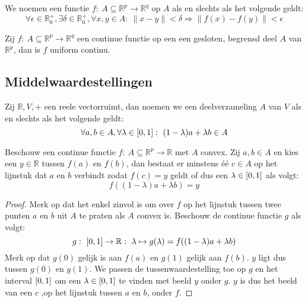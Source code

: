 \documentclass[main.tex]{subfiles}
\begin{document}
\begin{de}
  We noemen een functie $f:\ A \subseteq \mathbb{R}^{p} \rightarrow \mathbb{R}^{q}$  op $A$ als en slechts als het volgende geldt:
  \[ \forall \epsilon \in \mathbb{R}_{0}^{+}, \exists \delta \in \mathbb{R}_{0}^{+}, \forall x,y \in A:\ \|x-y\| < \delta \Rightarrow \|f(x)-f(y)\| < \epsilon \]
\end{de}

\begin{st}
  Zij $f:\ A \subseteq \mathbb{R}^{p} \rightarrow \mathbb{R}^{q}$ een continue functie op een een gesloten, begrensd deel $A$ van $\mathbb{R}^{p}$, dan is $f$ uniform continu.
\end{st}

\subsection{Middelwaardestellingen}

\begin{de}
  Zij $\mathbb{R},V,+$ een reele vectorruimt, dan noemen we een deelverzameling $A$ van $V$  als en slechts als het volgende geldt:
  \[ \forall a,b \in A, \forall \lambda \in \interval{0}{1}:\ (1-\lambda)a+\lambda b \in A \]
\end{de}

\begin{pr}
  Beschouw een continue functie $f:\ A \subseteq \mathbb{R}^{p} \rightarrow \mathbb{R}$ met $A$ convex.
  Zij $a,b\in A$ en kies een $y\in \mathbb{R}$ tussen $f(a)$ en $f(b)$, dan bestaat er minstens \'e\'e $c\in A$ op het lijnstuk dat $a$ en $b$ verbindt zodat $f(c) = y$ geldt of dus een $\lambda \in \interval{0}{1}$ als volgt:
  \[ f((1-\lambda)a+\lambda b) = y \]

  \begin{proof}
    Merk op dat het enkel zinvol is om over $f$ op het lijnstuk tussen twee punten $a$ en $b$ uit $A$ te praten als $A$ convex is.
    Beschouw de continue functie $g$ als volgt:
    \[ g:\ \interval{0}{1} \rightarrow \mathbb{R}:\ \lambda \mapsto g(\lambda) = f((1-\lambda)a+\lambda b) \]
    Merk op dat $g(0)$ gelijk is aan $f(a)$ en $g(1)$ gelijk aan $f(b)$.
    $y$ ligt dus tussen $g(0)$ en $g(1)$.
    We passen de tussenwaardestelling toe op $g$ en het interval $\interval{0}{1}$ om een $\lambda\in \interval{0}{1}$ te vinden met beeld $y$ onder $g$.
    $y$ is dus het beeld van een $c$ ,op het lijnstuk tussen $a$ en $b$, onder $f$.
  \end{proof}
\end{pr}
\end{document}
